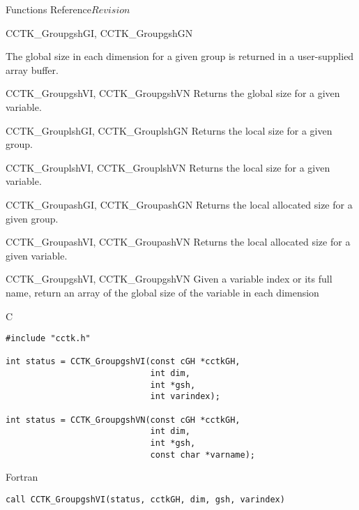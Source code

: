 \begin{cactuspart}{ Functions Reference}{}{$Revision$}
\begin{FunctionDescription}{CCTK\_GroupgshGI, CCTK\_GroupgshGN}
\begin{Discussion}
The global size in each dimension for a given group is returned in a user-supplied array buffer.
\end{Discussion}

\begin{SeeAlsoSection}
\begin{SeeAlso}{CCTK\_GroupgshVI, CCTK\_GroupgshVN}
Returns the global size for a given variable.
\end{SeeAlso}
\begin{SeeAlso}{CCTK\_GrouplshGI, CCTK\_GrouplshGN}
Returns the local size for a given group.
\end{SeeAlso}
\begin{SeeAlso}{CCTK\_GrouplshVI, CCTK\_GrouplshVN}
Returns the local size for a given variable.
\end{SeeAlso}
\begin{SeeAlso}{CCTK\_GroupashGI, CCTK\_GroupashGN}
Returns the local allocated size for a given group.
\end{SeeAlso}
\begin{SeeAlso}{CCTK\_GroupashVI, CCTK\_GroupashVN}
Returns the local allocated size for a given variable.
\end{SeeAlso}
\end{SeeAlsoSection}
\end{FunctionDescription}


\begin{FunctionDescription}{CCTK\_GroupgshVI, CCTK\_GroupgshVN}
\label{CCTK-GroupgshVI}
\label{CCTK-GroupgshVN}
Given a variable index or its full name, return an array of the global size of the variable in each dimension

\begin{SynopsisSection}
\begin{Synopsis}{C}
\begin{verbatim}
#include "cctk.h"

int status = CCTK_GroupgshVI(const cGH *cctkGH,
                             int dim,
                             int *gsh,
                             int varindex);

int status = CCTK_GroupgshVN(const cGH *cctkGH,
                             int dim,
                             int *gsh,
                             const char *varname);
\end{verbatim}
\end{Synopsis}
\begin{Synopsis}{Fortran}
\begin{verbatim}
call CCTK_GroupgshVI(status, cctkGH, dim, gsh, varindex)


\end{verbatim}
\end{Synopsis}
\end{SynopsisSection}
\end{FunctionDescription}
\end{cactuspart}
